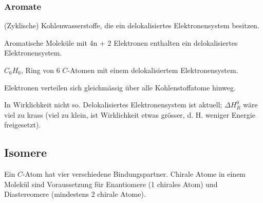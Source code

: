 \subsubsection{Aromate}

\begin{definition}[Aromat]
	(Zyklische) Kohlenwasserstoffe, die ein delokalisiertes Elektronensystem besitzen.
\end{definition}

\begin{definition}
	Aromatische Moleküle mit 4n + 2 Elektronen enthalten ein delokalisiertes Elektronensystem.
\end{definition}

\begin{definition}[Benzol]
	$C_6H_6$, Ring von 6 $C$-Atomen mit einem delokalisiertem Elektronensystem. \\
	
\end{definition}

\begin{definition}
	Elektronen verteilen sich gleichmässig über alle Kohlenstoffatome hinweg.
\end{definition}

\begin{definition}
	In Wirklichkeit nicht so. Delokalisiertes Elektronensystem ist aktuell; $\Delta H^0_R$ wäre viel zu krass (viel zu klein, ist Wirklichkeit etwas grösser, d. H. weniger Energie freigesetzt).
	\leavevmode \\
	
\end{definition}

\subsection{Isomere}

\begin{definition}[Chiralität]
	Ein $C$-Atom hat vier verschiedene Bindungspartner. Chirale Atome in einem Molekül sind Voraussetzung für Enantiomere (1 chirales Atom) und Diastereomere (mindestens 2 chirale Atome).
\end{definition}

